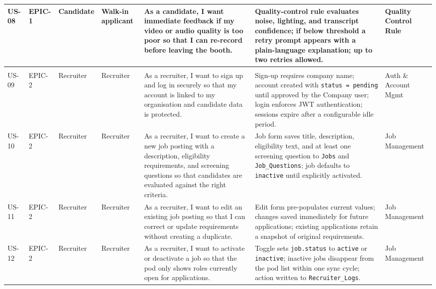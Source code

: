 \begin{longtable}{|p{0.8cm}|p{1.0cm}|p{1.2cm}|p{1.4cm}|p{4.2cm}|p{4.2cm}|p{1.8cm}|}
\rowcolor{nhRow1}
US-08 & EPIC-1 & Candidate & Walk-in applicant &
As a candidate, I want immediate feedback if my video or audio quality is too poor so that I can re-record before leaving the booth. &
Quality-control rule evaluates noise, lighting, and transcript confidence; if below threshold a retry prompt appears with a plain-language explanation; up to two retries allowed. & Quality Control Rule \\
\hline

\rowcolor{nhEpic2}
\multicolumn{7}{|l|}{\hspace{4pt}\textcolor{nhEpic2txt}{\textbf{EPIC-2 \quad Recruiter Workflow}}}\\
\hline

\rowcolor{nhRow2}
US-09 & EPIC-2 & Recruiter & Recruiter &
As a recruiter, I want to sign up and log in securely so that my account is linked to my organisation and candidate data is protected. &
Sign-up requires company name; account created with \texttt{status = pending} until approved by the Company user; login enforces JWT authentication; sessions expire after a configurable idle period. &
Auth \& Account Mgmt \\
\hline

\rowcolor{nhRow2}
US-10 & EPIC-2 & Recruiter & Recruiter &
As a recruiter, I want to create a new job posting with a description, eligibility requirements, and screening questions so that candidates are evaluated against the right criteria. &
Job form saves title, description, eligibility text, and at least one screening question to \texttt{Jobs} and \texttt{Job\_Questions}; job defaults to \texttt{inactive} until explicitly activated. & Job Management \\
\hline

\rowcolor{nhRow2}
US-11 & EPIC-2 & Recruiter & Recruiter &
As a recruiter, I want to edit an existing job posting so that I can correct or update requirements without creating a duplicate. &
Edit form pre-populates current values; changes saved immediately for future applications; existing applications retain a snapshot of original requirements. & Job Management \\
\hline

\rowcolor{nhRow2}
US-12 & EPIC-2 & Recruiter & Recruiter &
As a recruiter, I want to activate or deactivate a job so that the pod only shows roles currently open for applications. &
Toggle sets \texttt{job.status} to \texttt{active} or \texttt{inactive}; inactive jobs disappear from the pod list within one sync cycle; action written to \texttt{Recruiter\_Logs}. & Job Management \\
\hline


\end{longtable}
